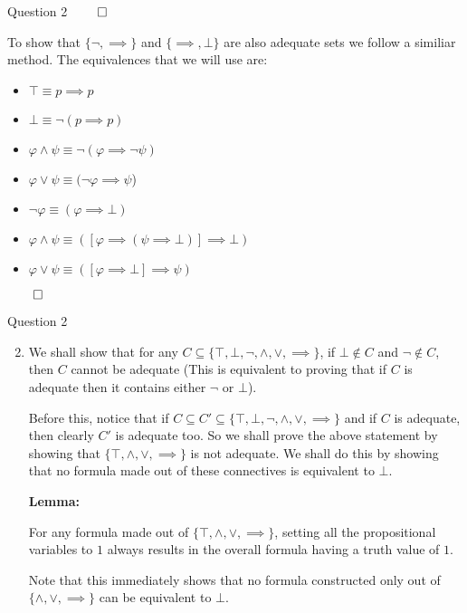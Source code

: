 \documentclass{beamer}
\begin{document}
{\begin{frame}{Question 2}
            $\qed$

            To show that $\{\neg, \implies\}$ and $\{\implies, \bot\}$ are also adequate sets we follow a similiar method. The equivalences that we will use are:
            \begin{itemize}
                \item $\top \equiv p \implies p$
                \item $\bot \equiv \neg (p \implies p)$
                \item $\varphi \land \psi \equiv \neg (\varphi \implies \neg \psi)$
                \item $\varphi \lor \psi \equiv (\neg \varphi \implies \psi$)
                \item $\neg \varphi \equiv (\varphi \implies \bot)$
                \item $\varphi \land \psi \equiv \left(\left[\varphi \implies (\psi \implies \bot)\right] \implies \bot\right)$
                \item $\varphi \lor \psi \equiv (\left[\varphi \implies \bot\right] \implies \psi)$
            \end{itemize}
            $\qed$
        \end{frame}
        \begin{frame}{Question 2}
            \begin{enumerate}
                \setcounter{enumi}{1}
                \item We shall show that for any $C \subseteq \{\top, \bot, \neg, \land, \lor, \implies\}$, if $\bot \notin C$ and $\neg \notin C$, then $C$ cannot be adequate (This is equivalent to proving that if $C$ is adequate then it contains either $\neg$ or $\bot$).
                
                Before this, notice that if $C \subseteq C' \subseteq \{\top, \bot, \neg, \land, \lor, \implies\}$ and if $C$ is adequate, then clearly $C'$ is adequate too. So we shall prove the above statement by showing that $\{\top, \land, \lor, \implies\}$ is not adequate. We shall do this by showing that no formula made out of these connectives is equivalent to $\bot$.

                \textbf{Lemma:}

                For any formula made out of $\{\top, \land, \lor, \implies\}$, setting all the propositional variables to $1$ always results in the overall formula having a truth value of $1$.

                Note that this immediately shows that no formula constructed only out of $\{\land, \lor, \implies\}$ can be equivalent to $\bot$.


\end{enumerate}
\end{frame}}
\end{document}
